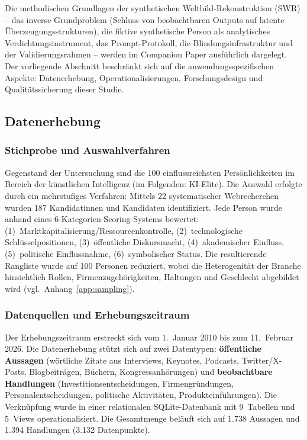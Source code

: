 \documentclass[12pt,a4paper]{article}
\begin{document}
Die methodischen Grundlagen der synthetischen Weltbild-Rekonstruktion (SWR) -- das inverse Grundproblem (Schluss von beobachtbaren Outputs auf latente \"Uberzeugungsstrukturen), die fiktive synthetische Person als analytisches Verdichtungsinstrument, das Prompt-Protokoll, die Blindungsinfrastruktur und der Validierungsrahmen -- werden im Companion Paper \citep{Geiger2026SWR} ausf\"uhrlich dargelegt. Der vorliegende Abschnitt beschr\"ankt sich auf die anwendungsspezifischen Aspekte: Datenerhebung, Operationalisierungen, Forschungsdesign und Qualit\"atssicherung dieser Studie.


\subsection{Datenerhebung}
\label{sec:methodik:daten}

\subsubsection{Stichprobe und Auswahlverfahren}

Gegenstand der Untersuchung sind die 100 einflussreichsten Pers\"onlichkeiten im Bereich der k\"unstlichen Intelligenz (im Folgenden: KI-Elite). Die Auswahl erfolgte durch ein mehrstufiges Verfahren: Mittels 22 systematischer Webrecherchen wurden 187 Kandidatinnen und Kandidaten identifiziert. Jede Person wurde anhand eines 6-Kategorien-Scoring-Systems bewertet: (1)~Marktkapitalisierung/Ressourcenkontrolle, (2)~technologische Schl\"usselpositionen, (3)~\"offentliche Diskursmacht, (4)~akademischer Einfluss, (5)~politische Einflussnahme, (6)~symbolischer Status. Die resultierende Rangliste wurde auf 100 Personen reduziert, wobei die Heterogenit\"at der Branche hinsichtlich Rollen, Firmenzugeh\"origkeiten, Haltungen und Geschlecht abgebildet wird (vgl.\ Anhang~\ref{app:sampling}).

\subsubsection{Datenquellen und Erhebungszeitraum}

Der Erhebungszeitraum erstreckt sich vom 1.~Januar 2010 bis zum 11.~Februar 2026. Die Datenerhebung st\"utzt sich auf zwei Datentypen: \textbf{\"offentliche Aussagen} (w\"ortliche Zitate aus Interviews, Keynotes, Podcasts, Twitter/X-Posts, Blogbeitr\"agen, B\"uchern, Kongressanh\"orungen) und \textbf{beobachtbare Handlungen} (Investitionsentscheidungen, Firmengr\"undungen, Personalentscheidungen, politische Aktivit\"aten, Produkteinf\"uhrungen). Die Verkn\"upfung wurde in einer relationalen SQLite-Datenbank mit 9~Tabellen und 5~Views operationalisiert. Die Gesamtmenge bel\"auft sich auf 1.738 Aussagen und 1.394 Handlungen (3.132 Datenpunkte).
\end{document}
